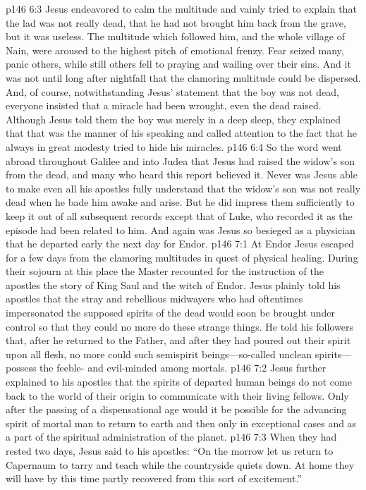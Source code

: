 \vs p146 6:3 Jesus endeavored to calm the multitude and vainly tried to explain that the lad was not really dead, that he had not brought him back from the grave, but it was useless. The multitude which followed him, and the whole village of Nain, were aroused to the highest pitch of emotional frenzy. Fear seized many, panic others, while still others fell to praying and wailing over their sins. And it was not until long after nightfall that the clamoring multitude could be dispersed. And, of course, notwithstanding Jesus’ statement that the boy was not dead, everyone insisted that a miracle had been wrought, even the dead raised. Although Jesus told them the boy was merely in a deep sleep, they explained that that was the manner of his speaking and called attention to the fact that he always in great modesty tried to hide his miracles.
\vs p146 6:4 So the word went abroad throughout Galilee and into Judea that Jesus had raised the widow’s son from the dead, and many who heard this report believed it. Never was Jesus able to make even all his apostles fully understand that the widow’s son was not really dead when he bade him awake and arise. But he did impress them sufficiently to keep it out of all subsequent records except that of Luke, who recorded it as the episode had been related to him. And again was Jesus so besieged as a physician that he departed early the next day for Endor.\plusone
{}
\vs p146 7:1 At Endor Jesus escaped for a few days from the clamoring multitudes in quest of physical healing. During their sojourn at this place the Master recounted for the instruction of the apostles the story of King Saul and the witch of Endor. Jesus plainly told his apostles that the stray and rebellious midwayers who had oftentimes impersonated the supposed spirits of the dead would soon be brought under control so that they could no more do these strange things. He told his followers that, after he returned to the Father, and after they had poured out their spirit upon all flesh, no more could such semispirit beings---so\hyp{}called unclean spirits---possess the feeble\hyp{} and evil\hyp{}minded among mortals.\plusone
\vs p146 7:2 Jesus further explained to his apostles that the spirits of departed human beings do not come back to the world of their origin to communicate with their living fellows. Only after the passing of a dispensational age would it be possible for the advancing spirit of mortal man to return to earth and then only in exceptional cases and as a part of the spiritual administration of the planet.
\vs p146 7:3 When they had rested two days, Jesus said to his apostles: \textcolor{ubdarkred}{“On the morrow let us return to Capernaum to tarry and teach while the countryside quiets down. At home they will have by this time partly recovered from this sort of excitement.”}
